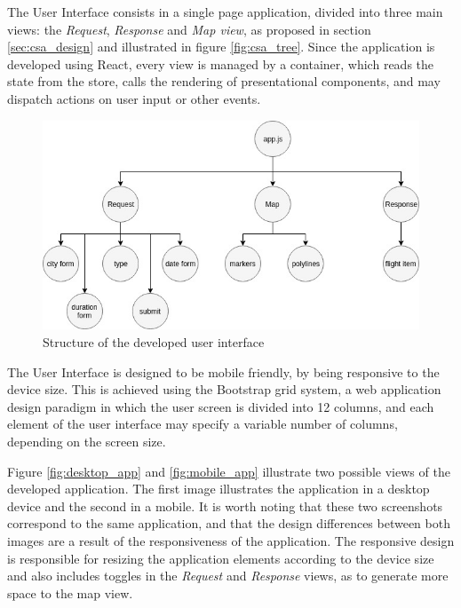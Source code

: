 The User Interface consists in a single page application, divided into three main views: the \textit{Request}, \textit{Response} and \textit{Map view}, as proposed in section \ref{sec:csa_design} and illustrated in figure \ref{fig:csa_tree}. Since the application is developed using React, every view is managed by a container, which reads the state from the store, calls the rendering of presentational components, and may dispatch actions on user input or other events. 

\begin{figure}[htpb]
  \centering
  \includegraphics[width=.8\textwidth]{./Figures/system_implementation/csa_tree.jpg}
  \caption{Structure of the developed user interface}
  \label{fig:csa_tre}  
\end{figure}

The User Interface is designed to be mobile friendly, by being responsive to the device size. This is achieved using the Bootstrap grid system, a web application design paradigm in which the user screen is divided into 12 columns, and each element of the user interface may specify a variable number of columns, depending on the screen size.

Figure \ref{fig:desktop_app} and \ref{fig:mobile_app} illustrate two possible views of the developed application. The first image illustrates the application in a desktop device and the second in a mobile. It is worth noting that these two screenshots correspond to the same application, and that the design differences between both images are a result of the responsiveness of the application. The responsive design is responsible for resizing the application elements according to the device size and also includes toggles in the \textit{Request} and \textit{Response} views, as to generate more space to the map view. 


